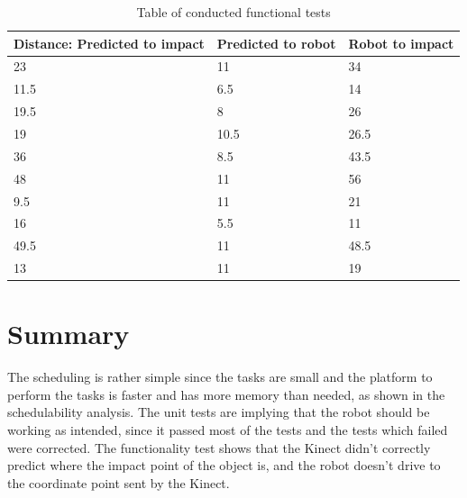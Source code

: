 \begin{table}[H]
	\begin{center}
		\begin{tabular}{ | p{5cm} | p{5cm} | p{5cm} |}
			\hline
			\textbf{Distance: Predicted to impact} & \textbf{Predicted to robot} & \textbf{Robot to impact} \\ \hline
			23 & 11 & 34 \\ \hline
			11.5 & 6.5 & 14 \\ \hline
			19.5 & 8 & 26 \\ \hline
			19 & 10.5 & 26.5 \\ \hline
			36 & 8.5 & 43.5 \\ \hline
			48 & 11 & 56 \\ \hline
			9.5 & 11 & 21 \\ \hline
			16 & 5.5 & 11 \\ \hline
			49.5 & 11 & 48.5 \\ \hline
			13 & 11 & 19 \\ \hline
			
		\end{tabular}
		\caption{Table of conducted functional tests}
		\label{table:FuncTest}
	\end{center}
\end{table}

\section{Summary}
\label{sec:summary}
The scheduling is rather simple since the tasks are small and the platform to perform the tasks is faster and has more memory than needed, as shown in the schedulability analysis. The unit tests are implying that the robot should be working as intended, since it passed most of the tests and the tests which failed were corrected. The functionality test shows that the Kinect didn’t correctly predict where the impact point of the object is, and the robot doesn’t drive to the coordinate point sent by the Kinect. 